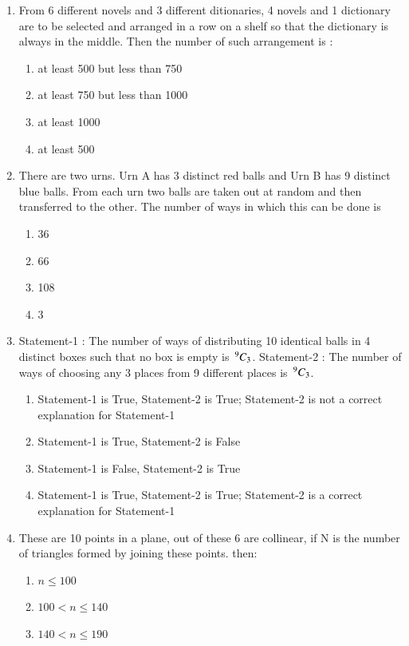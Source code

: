 \begin{enumerate}[label=\arabic*.,ref=\thesubsection.\theenumi]
\item From 6 different novels and 3 different ditionaries, 4 novels and 1 dictionary are to be selected and arranged in a row on a shelf so that the dictionary is always in the middle. Then the number of such arrangement is :
\begin{enumerate}
\item at least 500 but less than 750
\item at least 750 but less than 1000
\item at least 1000
\item at least 500\\ 
\end{enumerate}
\item There are two urns. Urn A has 3 distinct red balls and Urn B has 9 distinct blue balls. From each urn two balls are taken out at random and then transferred to the other. The number of ways in which this can be done is
\begin{enumerate}
\item 36
\item 66 
\item 108
\item 3\\
\end{enumerate}
\item Statement-1 :  The number of ways of distributing 10 identical balls in 4 distinct boxes such that no box is empty is $\,^{9}C_{3}$.
Statement-2 : The number of ways of choosing any 3 places from 9 different places is $\,^{9}C_{3}$.
\begin{enumerate}
\item Statement-1 is True, Statement-2 is True; Statement-2 is not a correct explanation for Statement-1
\item Statement-1 is True, Statement-2 is False
\item Statement-1 is False, Statement-2 is True
\item Statement-1 is True, Statement-2 is True; Statement-2 is a correct explanation for Statement-1\\
\end{enumerate} 
\item These are 10 points in a plane, out of these 6 are collinear, if N is the number of triangles formed by joining these points. then:
\begin{enumerate}
\item $n \leq 100$
\item $100 < n \leq 140$
\item $140 < n \leq 190$

\end{enumerate}
\end{enumerate}

